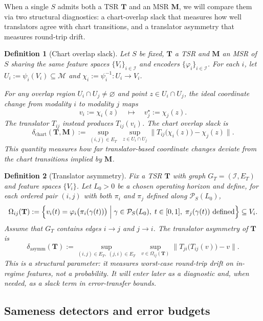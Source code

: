 \documentclass[11pt]{article}
\newtheorem{definition}{Definition}
\begin{document}
When a single $S$ admits both a TSR $\mathbf{T}$ and an MSR $\mathbf{M}$, we will compare them
via two structural diagnostics: a chart-overlap slack that measures how well translators agree
with chart transitions, and a translator asymmetry that measures round-trip drift.

\begin{definition}[Chart overlap slack]
\label{def:chart-slack}
Let $S$ be fixed, $\mathbf{T}$ a TSR and $\mathbf{M}$ an MSR of $S$ sharing the same
feature spaces $\{V_i\}_{i\in\mathcal{I}}$ and encoders $\{\varphi_i\}_{i\in\mathcal{I}}$.
For each $i$, let $U_i:=\psi_i(V_i)\subseteq\mathcal{M}$ and $\chi_i:=\psi_i^{-1}:U_i\to V_i$.

For any overlap region $U_i\cap U_j\neq\varnothing$ and point $z\in U_i\cap U_j$,
the ideal coordinate change from modality $i$ to modality $j$ maps
\[
v_i := \chi_i(z)
\quad\mapsto\quad
v_j^\star := \chi_j(z).
\]
The translator $T_{ij}$ instead produces $T_{ij}(v_i)$. The \emph{chart overlap slack} is
\[
\delta_{\mathrm{chart}}(\mathbf{T},\mathbf{M})
:=
\sup_{(i,j)\in E_T}
\;\sup_{z\in U_i\cap U_j}
\bigl\|
T_{ij}\bigl(\chi_i(z)\bigr) - \chi_j(z)
\bigr\|.
\]
This quantity measures how far translator-based coordinate changes deviate from the
chart transitions implied by $\mathbf{M}$.
\end{definition}

\begin{definition}[Translator asymmetry]
\label{def:translator-asymmetry}
Fix a TSR $\mathbf{T}$ with graph $G_T=(\mathcal{I},E_T)$ and feature spaces $\{V_i\}$.
Let $L_0>0$ be a chosen operating horizon and define, for each ordered pair $(i,j)$ with
both $\pi_i$ and $\pi_j$ defined along $\mathcal{P}_S(L_0)$,
\[
\Omega_{ij}(\mathbf{T})
:=
\Bigl\{
v_i(t)
=
\varphi_i\bigl(\pi_i(\gamma(t))\bigr)
\;\Big|\;
\gamma\in\mathcal{P}_S(L_0),\; t\in[0,1],\;
\pi_j(\gamma(t))\ \text{defined}
\Bigr\}
\subseteq V_i.
\]
Assume that $G_T$ contains edges $i\to j$ and $j\to i$. The \emph{translator asymmetry}
of $\mathbf{T}$ is
\[
\delta_{\mathrm{asymm}}(\mathbf{T})
:=
\sup_{(i,j)\in E_T,\; (j,i)\in E_T}
\;\sup_{v\in \Omega_{ij}(\mathbf{T})}
\bigl\|
T_{ji}\bigl(T_{ij}(v)\bigr) - v
\bigr\|.
\]
This is a structural parameter: it measures worst-case round-trip drift on in-regime
features, not a probability. It will enter later as a diagnostic and, when needed,
as a slack term in error-transfer bounds.
\end{definition}

\subsection{Sameness detectors and error budgets}
\label{subsec:detector}
\end{document}
